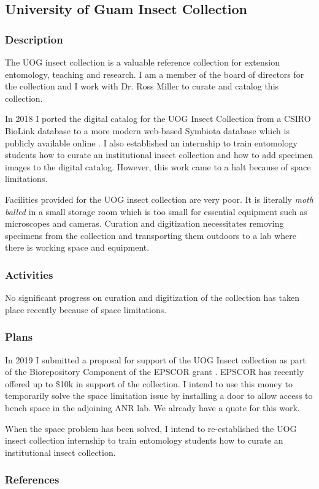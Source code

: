 \subsection{University of Guam Insect Collection}
\begin{refsection}
	
\subsubsection{Description}

The UOG insect collection is a valuable reference collection for extension
entomology, teaching and research. I am a member of the board of directors
for the collection and I work with Dr. Ross Miller to curate and catalog
this collection.

In 2018 I ported the digital catalog for the UOG Insect Collection from a
CSIRO BioLink database to a more modern web-based Symbiota database
which is publicly available online \cite{moore_scan_2018}. I also established an internship to train entomology students how to curate an institutional insect collection and how to add specimen images to the digital catalog\cite{moore_internship_2018}. However, this work came to a halt because of space limitations. 

Facilities provided for the UOG insect collection are very poor. It is literally \textit{moth balled} in a small storage room which is too small for essential equipment such as microscopes and cameras. Curation and digitization necessitates removing specimens from the collection and transporting them outdoors to a lab where there is working space and equipment.

\subsubsection{Activities}

No significant progress on curation and digitization of the collection has taken place recently because of space limitations.

\subsubsection{Plans}

In 2019 I submitted a proposal for support of the UOG Insect collection as part of the Biorepository Component of the EPSCOR grant \cite{mooreUniversityGuamInsect2019}. EPSCOR has recently offered up to \$10k in support of the collection. I intend to use this money to temporarily solve the space limitation issue by installing a door to allow access to bench space in the adjoining ANR lab. We already have a quote for this work.

When the space problem has been solved, I intend to re-established the UOG insect collection internship to train entomology students how to curate an institutional insect collection.

\subsubsection{References}
\printbibliography[heading=none]
\end{refsection}

